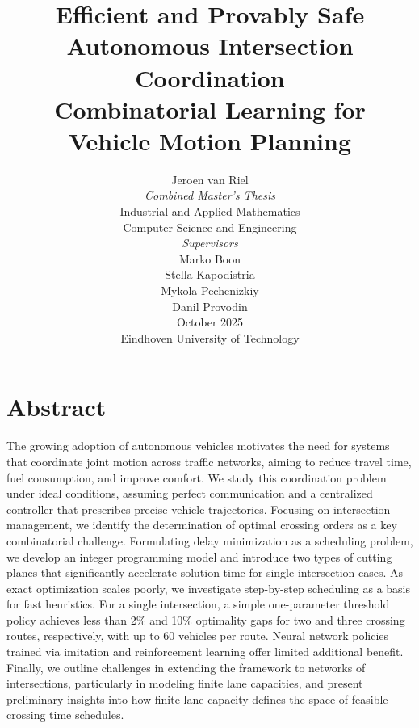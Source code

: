 \documentclass{report}
\title{%
  {\huge\bfseries Efficient and Provably Safe Autonomous Intersection Coordination}\\[1em]
  {\Large\bfseries Combinatorial Learning for\\[-0.3em] 
  Vehicle Motion Planning}
}
\author{%
  \Large Jeroen van Riel \\[12em]
  {\normalsize\itshape Combined Master's Thesis}\\[0.2em]
  \normalsize
  Industrial and Applied Mathematics\\
  \normalsize
  Computer Science and Engineering\\[2em]
  {\normalsize\itshape Supervisors}\\[0.2em]
  \normalsize Marko Boon\\
  \normalsize Stella Kapodistria\\
  \normalsize Mykola Pechenizkiy\\
  \normalsize Danil Provodin\\[12em]
  \normalsize October 2025\\[0.1em]
  \normalsize Eindhoven University of Technology
}
\date{}
\theoremstyle{definition}
\theoremstyle{plain}
\begin{document}
\noindent\makebox[\textwidth][c]{%
  \begin{minipage}[h]{\textwidth}
  \maketitle
  \end{minipage}
}



\chapter*{Abstract}

The growing adoption of autonomous vehicles motivates the need for systems that
coordinate joint motion across traffic networks, aiming to reduce travel time,
fuel consumption, and improve comfort. We study this coordination problem under
ideal conditions, assuming perfect communication and a centralized controller
that prescribes precise vehicle trajectories. Focusing on intersection
management, we identify the determination of optimal crossing orders as a key
combinatorial challenge. Formulating delay minimization as a scheduling problem,
we develop an integer programming model and introduce two types of cutting
planes that significantly accelerate solution time for single-intersection
cases. As exact optimization scales poorly, we investigate step-by-step
scheduling as a basis for fast heuristics. For a single intersection, a simple
one-parameter threshold policy achieves less than 2\% and 10\% optimality gaps
for two and three crossing routes, respectively, with up to 60 vehicles per
route. Neural network policies trained via imitation and reinforcement learning
offer limited additional benefit. Finally, we outline challenges in extending
the framework to networks of intersections, particularly in modeling finite lane
capacities, and present preliminary insights into how finite lane capacity
defines the space of feasible crossing time schedules.
 
\end{document}
